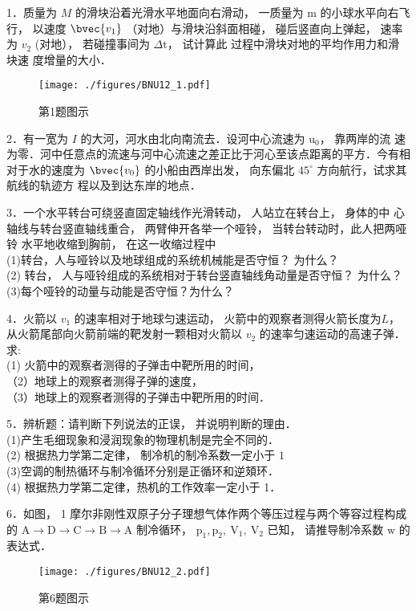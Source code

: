 
1．质量为 $M$ 的滑块沿着光滑水平地面向右滑动， 一质量为 $\mathrm{m}$ 的小球水平向右飞行， 以速度 $\bvec{v_1}$ （对地）与滑块沿斜面相碰， 碰后竖直向上弹起， 速率为
$v_2$ (对地）， 若碰撞事间为 $\Delta \mathrm{t}$， 试计算此 过程中滑块对地的平均作用力和滑块速
度增量的大小．
\begin{figure}[ht]
\centering
\texttt{[image: ./figures/BNU12\_1.pdf]}
\caption{第1题图示} \label{BNU12_fig1}
\end{figure}

2．有一宽为 $I$ 的大河，河水由北向南流去．设河中心流速为 $\mathrm{u}_{0}$， 靠两岸的流 速为零．河中任意点的流速与河中心流速之差正比于河心至该点距离的平方．今有相 对于水的速度为 $\bvec{v_0}$ 的小船由西岸出发， 向东偏北 $45^{\circ}$ 方向航行，试求其航线的轨迹方 程以及到达东岸的地点．

3．一个水平转台可绕竖直固定轴线作光滑转动， 人站立在转台上， 身体的中 心轴线与转台竖直轴线重合， 两臂伸开各举一个哑铃， 当转台转动时，此人把两哑铃 水平地收缩到胸前， 在这一收缩过程中\\
(1)转台，人与哑铃以及地球组成的系统机械能是否守恒？ 为什么？\\
(2) 转台， 人与哑铃组成的系统相对于转台竖直轴线角动量是否守恒？ 为什么？
(3)每个哑铃的动量与动能是否守恒？为什么？

4．火箭以 $v_1$ 的速率相对于地球匀速运动， 火箭中的观察者测得火箭长度为$L$，从火箭尾部向火箭前端的靶发射一颗相对火箭以 $v_{2}$ 的速率匀速运动的高速子弹． 求: \\(1) 火箭中的观察者测得的子弹击中靶所用的时间， \\（2）地球上的观察者测得子弹的速度， \\（3）地球上的观察者测得的子弹击中靶所用的时间．

5．辨析题：请判断下列说法的正误， 并说明判断的理由．\\
(1)产生毛细现象和浸润现象的物理机制是完全不同的．\\
(2) 根据热力学第二定律， 制冷机的制冷系数一定小于 $1$\\
(3)空调的制热循环与制冷循环分别是正循环和逆頍环．\\
(4) 根据热力学第二定律，热机的工作效率一定小于 1．

6．如图， 1 摩尔非刚性双原子分子理想气体作两个等压过程与两个等容过程构成的 $\mathrm{A} \rightarrow \mathrm{D} \rightarrow \mathrm{C} \rightarrow \mathrm{B} \rightarrow \mathrm{A}$
制冷循环， $\mathrm{p}_{1}, \mathrm{p}_{2}, \mathrm{~V}_{1}, \mathrm{~V}_{2}$ 已知， 请推导制冷系数 $\mathrm{w}$ 的表达式．
\begin{figure}[ht]
\centering
\texttt{[image: ./figures/BNU12\_2.pdf]}
\caption{第6题图示} \label{BNU12_fig2}
\end{figure}

